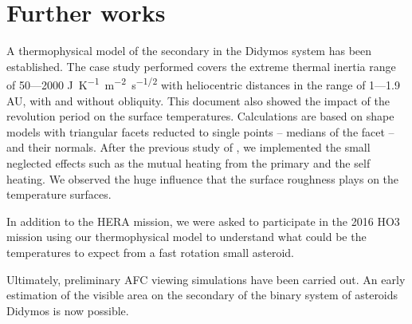 \section{Further works}
\label{furtherworks}

A thermophysical model of the secondary in the Didymos system has been established. The case study performed covers the extreme thermal inertia range of 50---2000 \si{J.K^{-1}.m^{-2}.s^{-1/2}} with heliocentric distances in the range of 1---1.9 \si{AU}, with and without obliquity. This document also showed the impact of the revolution period on the surface temperatures. Calculations are based on shape models with triangular facets reducted to single points -- medians of the facet -- and their normals. After the previous study of \cite{pelivan}, we implemented the small neglected effects such as the mutual heating from the primary and the self heating. We observed the huge influence that the surface roughness plays on the temperature surfaces.

In addition to the HERA mission, we were asked to participate in the 2016 HO3 mission using our thermophysical model to understand what could be the temperatures to expect from a fast rotation small asteroid.

Ultimately, preliminary AFC viewing simulations have been carried out. An early estimation of the visible area on the secondary of the binary system of asteroids Didymos is now possible.
